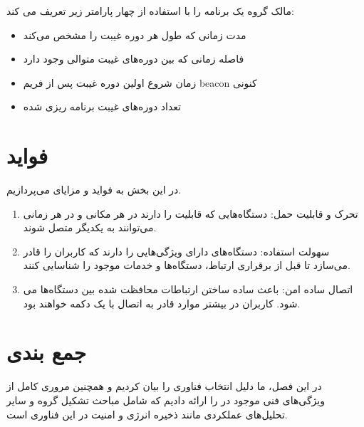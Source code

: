 مالک گروه یک برنامه
  را با استفاده از چهار پارامتر زیر تعریف می کند:
  \begin{itemize}
  	\item مدت زمانی که طول هر دوره غیبت را مشخص می‌کند
  	\item فاصله زمانی که بین دوره‌های غیبت متوالی وجود دارد
  	\item زمان شروع اولین دوره غیبت پس از فریم beacon کنونی
  	\item تعداد دوره‌های غیبت برنامه ریزی شده
  \end{itemize}




\section{فواید}
در این بخش به فواید و مزایای 
می‌پردازیم.
\begin{enumerate}
	\item تحرک و قابلیت حمل: دستگاه‌هایی که قابلیت 
	را دارند در هر مکانی و در هر زمانی می‌توانند به یکدیگر متصل شوند.
	\item سهولت استفاده: دستگاه‌های دارای 
 ویژگی‌هایی را دارند که کاربران را قادر می‌سازد تا قبل از برقراری ارتباط، دستگاه‌ها و خدمات موجود را شناسایی کنند.
     \item اتصال ساده امن: 
      باعث ساده ساختن ارتباطات محافظت شده بین دستگاه‌ها می شود. کاربران در بیشتر موارد قادر به اتصال با یک دکمه خواهند بود.
\end{enumerate}

\section{جمع بندی}
در این فصل، ما دلیل انتخاب فناوری 
را بیان کردیم و همچنین مروری کامل از ویژگی‌های فنی موجود در 
را ارائه دادیم که شامل مباحث تشکیل گروه و سایر تحلیل‌های عملکردی مانند ذخیره انرژی و امنیت در این فناوری است.

